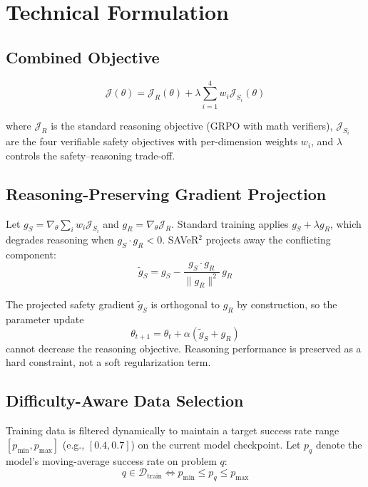 \documentclass[10pt,twocolumn]{article}
\begin{document}
\section{Technical Formulation}

\subsection*{Combined Objective}

\begin{equation}
\mathcal{J}(\theta) = \mathcal{J}_R(\theta) + \lambda \sum_{i=1}^{4} w_i \mathcal{J}_{S_i}(\theta)
\label{eq:combined}
\end{equation}

where $\mathcal{J}_R$ is the standard reasoning objective (GRPO with math verifiers), $\mathcal{J}_{S_i}$ are the four verifiable safety objectives with per-dimension weights $w_i$, and $\lambda$ controls the safety--reasoning trade-off.

\subsection*{Reasoning-Preserving Gradient Projection}

Let $g_S = \nabla_\theta \sum_i w_i \mathcal{J}_{S_i}$ and $g_R = \nabla_\theta \mathcal{J}_R$.
Standard training applies $g_S + \lambda g_R$, which degrades reasoning when $g_S \cdot g_R < 0$.
SAVeR$^2$ projects away the conflicting component:
\begin{equation}
\tilde{g}_S = g_S - \frac{g_S \cdot g_R}{\|g_R\|^2}\, g_R
\label{eq:proj}
\end{equation}

The projected safety gradient $\tilde{g}_S$ is orthogonal to $g_R$ by construction, so the parameter update
\begin{equation}
\theta_{t+1} = \theta_t + \alpha\!\left(\tilde{g}_S + g_R\right)
\label{eq:update}
\end{equation}
cannot decrease the reasoning objective.
Reasoning performance is preserved as a hard constraint, not a soft regularization term.

\subsection*{Difficulty-Aware Data Selection}

Training data is filtered dynamically to maintain a target success rate range $[p_{\min}, p_{\max}]$ (e.g., $[0.4, 0.7]$) on the current model checkpoint.
Let $p_q$ denote the model's moving-average success rate on problem $q$:
\begin{equation}
q \in \mathcal{D}_{\text{train}} \iff p_{\min} \leq p_q \leq p_{\max}
\label{eq:difficulty}
\end{equation}
\end{document}
